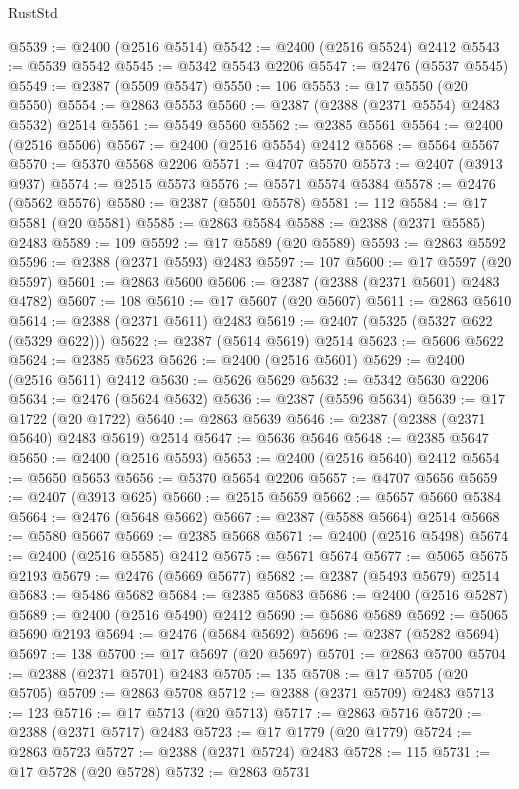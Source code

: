 \begin{lexlean}{RustStd}
\begin{coremodule}
{\begin{coremodule}
{{{{{{{{{{{{{{{{{{{{{{{{{{{{{{{{{{{{{{{{{{{{{{{{{{@5539 := @2400 (@2516 @5514)
@5542 := @2400 (@2516 @5524) @2412
@5543 := @5539 @5542
@5545 := @5342 @5543 @2206
@5547 := @2476 (@5537 @5545)
@5549 := @2387 (@5509 @5547)
@5550 := 106
@5553 := @17 @5550 (@20 @5550)
@5554 := @2863 @5553
@5560 := @2387 (@2388 (@2371 @5554) @2483 @5532) @2514
@5561 := @5549 @5560
@5562 := @2385 @5561
@5564 := @2400 (@2516 @5506)
@5567 := @2400 (@2516 @5554) @2412
@5568 := @5564 @5567
@5570 := @5370 @5568 @2206
@5571 := @4707 @5570
@5573 := @2407 (@3913 @937)
@5574 := @2515 @5573
@5576 := @5571 @5574 @5384
@5578 := @2476 (@5562 @5576)
@5580 := @2387 (@5501 @5578)
@5581 := 112
@5584 := @17 @5581 (@20 @5581)
@5585 := @2863 @5584
@5588 := @2388 (@2371 @5585) @2483
@5589 := 109
@5592 := @17 @5589 (@20 @5589)
@5593 := @2863 @5592
@5596 := @2388 (@2371 @5593) @2483
@5597 := 107
@5600 := @17 @5597 (@20 @5597)
@5601 := @2863 @5600
@5606 := @2387 (@2388 (@2371 @5601) @2483 @4782)
@5607 := 108
@5610 := @17 @5607 (@20 @5607)
@5611 := @2863 @5610
@5614 := @2388 (@2371 @5611) @2483
@5619 := @2407 (@5325 (@5327 @622 (@5329 @622)))
@5622 := @2387 (@5614 @5619) @2514
@5623 := @5606 @5622
@5624 := @2385 @5623
@5626 := @2400 (@2516 @5601)
@5629 := @2400 (@2516 @5611) @2412
@5630 := @5626 @5629
@5632 := @5342 @5630 @2206
@5634 := @2476 (@5624 @5632)
@5636 := @2387 (@5596 @5634)
@5639 := @17 @1722 (@20 @1722)
@5640 := @2863 @5639
@5646 := @2387 (@2388 (@2371 @5640) @2483 @5619) @2514
@5647 := @5636 @5646
@5648 := @2385 @5647
@5650 := @2400 (@2516 @5593)
@5653 := @2400 (@2516 @5640) @2412
@5654 := @5650 @5653
@5656 := @5370 @5654 @2206
@5657 := @4707 @5656
@5659 := @2407 (@3913 @625)
@5660 := @2515 @5659
@5662 := @5657 @5660 @5384
@5664 := @2476 (@5648 @5662)
@5667 := @2387 (@5588 @5664) @2514
@5668 := @5580 @5667
@5669 := @2385 @5668
@5671 := @2400 (@2516 @5498)
@5674 := @2400 (@2516 @5585) @2412
@5675 := @5671 @5674
@5677 := @5065 @5675 @2193
@5679 := @2476 (@5669 @5677)
@5682 := @2387 (@5493 @5679) @2514
@5683 := @5486 @5682
@5684 := @2385 @5683
@5686 := @2400 (@2516 @5287)
@5689 := @2400 (@2516 @5490) @2412
@5690 := @5686 @5689
@5692 := @5065 @5690 @2193
@5694 := @2476 (@5684 @5692)
@5696 := @2387 (@5282 @5694)
@5697 := 138
@5700 := @17 @5697 (@20 @5697)
@5701 := @2863 @5700
@5704 := @2388 (@2371 @5701) @2483
@5705 := 135
@5708 := @17 @5705 (@20 @5705)
@5709 := @2863 @5708
@5712 := @2388 (@2371 @5709) @2483
@5713 := 123
@5716 := @17 @5713 (@20 @5713)
@5717 := @2863 @5716
@5720 := @2388 (@2371 @5717) @2483
@5723 := @17 @1779 (@20 @1779)
@5724 := @2863 @5723
@5727 := @2388 (@2371 @5724) @2483
@5728 := 115
@5731 := @17 @5728 (@20 @5728)
@5732 := @2863 @5731
}}}}}}}}}}}}}}}}}}}}}}}}}}}}}}}}}}}}}}}}}}}}}}}}}}
\end{coremodule}}
\end{coremodule}
\end{lexlean}
